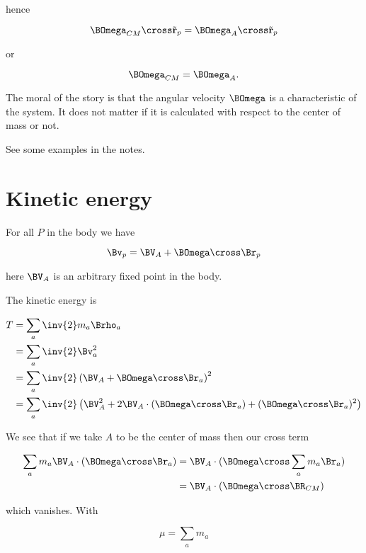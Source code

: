 hence

\begin{equation}\label{eqn:rigidBodyMotion:320}
\BOmega_{CM} \cross \tilde{\mathbf{r}}_p = \BOmega_A \cross \tilde{\mathbf{r}}_p
\end{equation}

or

\begin{equation}\label{eqn:rigidBodyMotion:340}
\BOmega_{CM} = \BOmega_A.
\end{equation}

The moral of the story is that the angular velocity $\BOmega$ is a characteristic of the system.  It does not matter if it is calculated with respect to the center of mass or not.

See some examples in the notes.

\section{Kinetic energy}

For all $P$ in the body we have

\begin{equation}\label{eqn:rigidBodyMotion:360}
\Bv_p = \BV_A + \BOmega \cross \Br_p
\end{equation}

here $\BV_A$ is an arbitrary fixed point in the body.

The kinetic energy is

\begin{align*}
T 
&= \sum_a \inv{2} m_a \Brho_a \\
&= \sum_a \inv{2} \Bv_a^2 \\
&= 
\sum_a \inv{2} \left(
\BV_A + \BOmega \cross \Br_a
\right)^2 \\
&=
\sum_a \inv{2} \left( \BV_A^2 +
2 \BV_A \cdot (\BOmega \cross \Br_a)
+ (\BOmega \cross \Br_a)^2
\right)
\end{align*}

We see that if we take $A$ to be the center of mass then our cross term

\begin{align*}
\sum_a m_a \BV_A \cdot (\BOmega \cross \Br_a)
&=
\BV_A \cdot (\BOmega \cross \sum_a m_a \Br_a) \\
&=
\BV_A \cdot (\BOmega \cross \BR_{CM} )
\end{align*}

which vanishes.  With 

\begin{equation}\label{eqn:rigidBodyMotion:380}
\mu = \sum_a m_a
\end{equation}

